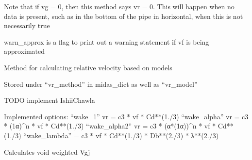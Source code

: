\documentclass[letterpaper,10pt,english]{sphinxmanual}
\begin{document}
\begin{fulllineitems}
\begin{fulllineitems}
\sphinxAtStartPar
Note that if vg = 0, then this method says vr = 0. This will happen when no data is present,
such as in the bottom of the pipe in horizontal, when this is not necessarily true

\sphinxAtStartPar
warn\_approx is a flag to print out a warning statement if vf is being approximated

\end{fulllineitems}


\begin{fulllineitems}
\label{\detokenize{api/MARIGOLD.Condition:MARIGOLD.Condition.calc_vr_model}}
\pysigstartsignatures
{}
\pysigstopsignatures
\sphinxAtStartPar
Method for calculating relative velocity based on models

\sphinxAtStartPar
Stored under “vr\_method” in midas\_dict as well as “vr\_model”

\sphinxAtStartPar
TODO implement Ishii\sphinxhyphen{}Chawla

\sphinxAtStartPar
Implemented options:
\sphinxhyphen{} “wake\_1” vr = \sphinxhyphen{} c3 * vf * Cd**(1./3)
\sphinxhyphen{} “wake\_alpha” vr = \sphinxhyphen{} c3 * (1\sphinxhyphen{}α)\textasciicircum{}n * vf * Cd**(1./3)
\sphinxhyphen{} “wake\_alpha2” vr = \sphinxhyphen{} c3 *  (α*(1\sphinxhyphen{}α))\textasciicircum{}n * vf * Cd**(1./3)
\sphinxhyphen{} “wake\_lambda” = \sphinxhyphen{} c3 * vf * Cd**(1./3) * Db**(2./3) * λ**(\sphinxhyphen{}2./3)

\end{fulllineitems}


\begin{fulllineitems}
\label{\detokenize{api/MARIGOLD.Condition:MARIGOLD.Condition.calc_vwvg}}
\pysigstartsignatures
{}
\pysigstopsignatures
\sphinxAtStartPar
Calculates void weighted Vgj


\end{fulllineitems}
\end{fulllineitems}
\end{document}
